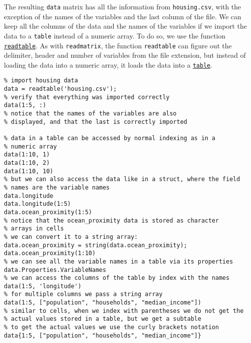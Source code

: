 \documentclass[12pt, a4paper]{article}
\begin{document}
The resulting \texttt{data} matrix has all the information from \texttt{housing.csv}, with the exception of the names of the variables and the last column of the file.
We can keep all the columns of the data and the names of the variables if we import the data to a \texttt{table} instead of a numeric array.
To do so, we use the function \href{https://www.mathworks.com/help/matlab/ref/readtable.html}{\texttt{readtable}}.
As with \texttt{readmatrix}, the function \texttt{readtable} can figure out the delimiter, header and number of variables from the file extension, but instead of loading the data into a numeric array, it loads the data into a \href{https://www.mathworks.com/help/matlab/ref/table.html}{\texttt{table}}.
\lstset{language=matlab,label= ,caption= ,captionpos=b,firstnumber=1,numbers=left,style=Matlab-editor}
\begin{lstlisting}
% import housing data
data = readtable('housing.csv');
% verify that everything was imported correctly
data(1:5, :)
% notice that the names of the variables are also
% displayed, and that the last is correctly imported

% data in a table can be accessed by normal indexing as in a
% numeric array
data(1:10, 1)
data(1:10, 2)
data(1:10, 10)
% but we can also access the data like in a struct, where the field
% names are the variable names
data.longitude
data.longitude(1:5)
data.ocean_proximity(1:5)
% notice that the ocean_proximity data is stored as character
% arrays in cells
% we can convert it to a string array:
data.ocean_proximity = string(data.ocean_proximity);
data.ocean_proximity(1:10)
% we can see all the variable names in a table via its properties
data.Properties.VariableNames
% we can access the columns of the table by index with the names
data(1:5, 'longitude')
% for multiple columns we pass a string array
data(1:5, ["population", "households", "median_income"])
% similar to cells, when we index with parentheses we do not get the
% actual values stored in a table, but we get a subtable
% to get the actual values we use the curly brackets notation
data{1:5, ["population", "households", "median_income"]}
\end{lstlisting}
\end{document}
